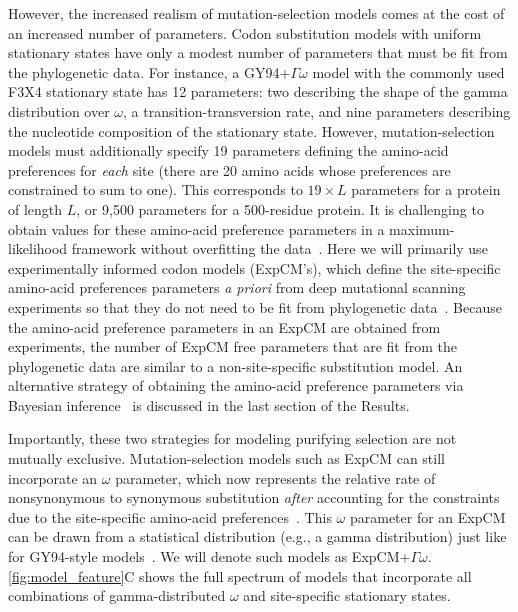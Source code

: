 \documentclass[11pt]{article}
\begin{document}
However, the increased realism of mutation-selection models comes at the cost of an increased number of parameters. 
Codon substitution models with uniform stationary states have only a modest number of parameters that must be fit from the phylogenetic data.
For instance, a GY94+$\Gamma\omega$ model with the commonly used F3X4 stationary state has 12 parameters: two describing the shape of the gamma distribution over $\omega$, a transition-transversion rate, and nine parameters describing the nucleotide composition of the stationary state.
However, mutation-selection models must additionally specify 19 parameters defining the amino-acid preferences for \emph{each} site (there are 20 amino acids whose preferences are constrained to sum to one).
This corresponds to $19\times L$ parameters for a protein of length $L$, or 9,500 parameters for a 500-residue protein.
It is challenging to obtain values for these amino-acid preference parameters in a maximum-likelihood framework without overfitting the data~\citep{rodrigue2013statistical}.
Here we will primarily use experimentally informed codon models (ExpCM's), which define the site-specific amino-acid preferences parameters \textit{a priori} from deep mutational scanning experiments so that they do not need to be fit from phylogenetic data~\citep[see Methods and][]{bloom2014experimentally, hilton2017phydms, bloom2017identification}.
Because the amino-acid preference parameters in an ExpCM are obtained from experiments, the number of ExpCM free parameters that are fit from the phylogenetic data are similar to a non-site-specific substitution model.
An alternative strategy of obtaining the amino-acid preference parameters via Bayesian inference~\citep{lartillot2004bayesian, rodrigue2014site} is discussed in the last section of the Results.

Importantly, these two strategies for modeling purifying selection are not mutually exclusive.
Mutation-selection models such as ExpCM can still incorporate an $\omega$ parameter, which now represents the relative rate of nonsynonymous to synonymous substitution \emph{after} accounting for the constraints due to the site-specific amino-acid preferences~\citep{bloom2017identification,rodrigue2017detecting}.
This $\omega$ parameter for an ExpCM can be drawn from a statistical distribution (e.g., a gamma distribution) just like for GY94-style models~\citep{rodrigue2014site,haddox2017mapping}. 
We will denote such models as ExpCM+$\Gamma\omega$.
\ref{fig:model_feature}C shows the full spectrum of models that incorporate all combinations of gamma-distributed $\omega$ and site-specific stationary states.
\end{document}
